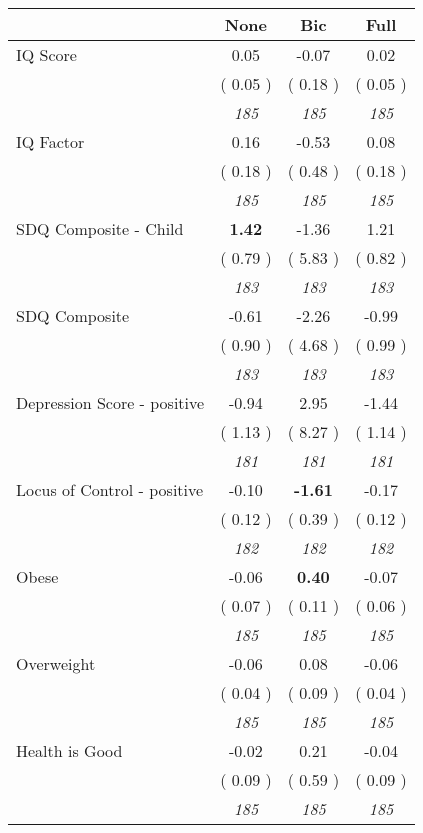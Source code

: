 \begin{tabular}{l c c c}
\toprule
 & None & Bic & Full \\
\midrule
IQ Score &      0.05 &     -0.07 &      0.02 \\
& (     0.05 ) & (     0.18 ) & (     0.05 ) \\
& \textit{ 185 } & \textit{ 185 } & \textit{ 185 } \\
IQ Factor &      0.16 &     -0.53 &      0.08 \\
& (     0.18 ) & (     0.48 ) & (     0.18 ) \\
& \textit{ 185 } & \textit{ 185 } & \textit{ 185 } \\
SDQ Composite - Child & \textbf{      1.42 } &     -1.36 &      1.21 \\
& (     0.79 ) & (     5.83 ) & (     0.82 ) \\
& \textit{ 183 } & \textit{ 183 } & \textit{ 183 } \\
SDQ Composite &     -0.61 &     -2.26 &     -0.99 \\
& (     0.90 ) & (     4.68 ) & (     0.99 ) \\
& \textit{ 183 } & \textit{ 183 } & \textit{ 183 } \\
Depression Score - positive &     -0.94 &      2.95 &     -1.44 \\
& (     1.13 ) & (     8.27 ) & (     1.14 ) \\
& \textit{ 181 } & \textit{ 181 } & \textit{ 181 } \\
Locus of Control - positive &     -0.10 & \textbf{     -1.61 } &     -0.17 \\
& (     0.12 ) & (     0.39 ) & (     0.12 ) \\
& \textit{ 182 } & \textit{ 182 } & \textit{ 182 } \\
Obese &     -0.06 & \textbf{      0.40 } &     -0.07 \\
& (     0.07 ) & (     0.11 ) & (     0.06 ) \\
& \textit{ 185 } & \textit{ 185 } & \textit{ 185 } \\
Overweight &     -0.06 &      0.08 &     -0.06 \\
& (     0.04 ) & (     0.09 ) & (     0.04 ) \\
& \textit{ 185 } & \textit{ 185 } & \textit{ 185 } \\
Health is Good &     -0.02 &      0.21 &     -0.04 \\
& (     0.09 ) & (     0.59 ) & (     0.09 ) \\
& \textit{ 185 } & \textit{ 185 } & \textit{ 185 } \\

\end{tabular}
